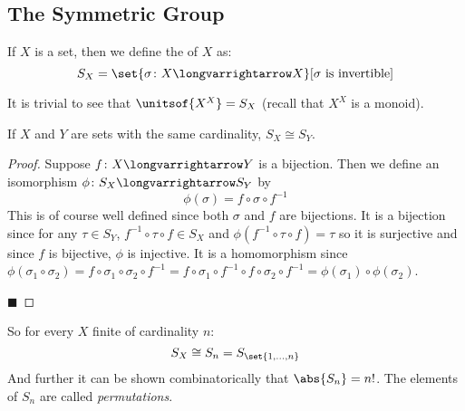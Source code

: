 \documentclass[10pt]{article}
\begin{document}


\bigskip

\subsection{The Symmetric Group}

\begin{defn*}

    If $X$ is a set, then we define the  of $X$ as:
    \[ S_X = \set{\sigma\colon X\longvarrightarrow X}[\sigma \text{ is invertible}] \]

\end{defn*}

It is trivial to see that $\unitsof{X^X}=S_X$ (recall that $X^X$ is a monoid).

\begin{prop*}

    If $X$ and $Y$ are sets with the same cardinality, $S_X\cong S_Y$.

\end{prop*}

\begin{proof}

    Suppose $f\colon X\longvarrightarrow Y$ is a bijection.
    Then we define an isomorphism $\phi\colon S_X\longvarrightarrow S_Y$ by
    \[ \phi(\sigma) = f\circ\sigma\circ f^{-1} \]
    This is of course well defined since both $\sigma$ and $f$ are bijections.
    It is a bijection since for any $\tau\in S_Y$, $f^{-1}\circ\tau\circ f\in S_X$ and $\phi(f^{-1}\circ\tau\circ f)=\tau$ so it is surjective and since $f$ is bijective, $\phi$ is injective.
    It is a homomorphism since $\phi(\sigma_1\circ\sigma_2)=f\circ\sigma_1\circ \sigma_2\circ f^{-1}=f\circ\sigma_1\circ f^{-1}\circ f\circ\sigma_2\circ f^{-1}=\phi(\sigma_1)\circ\phi(\sigma_2)$.

    \hfill$\blacksquare$

\end{proof}

So for every $X$ finite of cardinality $n$:
\[ S_X \cong S_n = S_{\set{1,\dots,n}} \]
And further it can be shown combinatorically that $\abs{S_n}=n!$.
The elements of $S_n$ are called \emph{permutations}.
\end{document}
